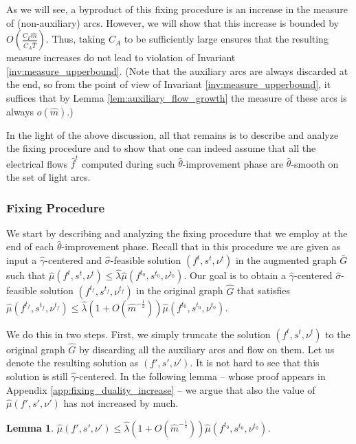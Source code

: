\documentclass[11pt, letterpaper]{article}
\newtheorem{lemma}[theorem]{Lemma}
\newcommand{\cfreeze}{C_{F}}
\newcommand{\cauxiliary}{C_{A}}
\newcommand{\oG}{\bar{G}}
\newcommand{\hG}{\widehat{G}}
\newcommand{\hm}{\widehat{m}}
\newcommand{\hT}{\widehat{T}}
\newcommand{\hmu}{\hat{\mu}}
\newcommand{\hgamma}{\hat{\gamma}}
\newcommand{\htheta}{\hat{\theta}}
\newcommand{\hlambda}{\hat{\lambda}}
\newcommand{\vnu}{\boldsymbol{\mathit{\nu}}}
\newcommand{\hvsigma}{\boldsymbol{\mathit{\hat{\sigma}}}}
\newcommand{\ff}{\boldsymbol{\mathit{f}}}
\newcommand{\hff}{\boldsymbol{\mathit{\hat{f}}}}
\renewcommand{\ss}{\boldsymbol{\mathit{s}}}
\begin{document}
As we will see, a byproduct of this fixing procedure is an increase in the measure of (non-auxiliary) arcs. However, we will show that this increase is bounded by $O(\frac{\cfreeze\hm}{\cauxiliary \hT})$. Thus, taking $\cauxiliary$ to be sufficiently large ensures that the resulting measure increases do not lead to violation of Invariant \ref{inv:measure_upperbound}. (Note that the auxiliary arcs are always discarded at the end, so from the point of view of Invariant \ref{inv:measure_upperbound}, it suffices that by Lemma \ref{lem:auxiliary_flow_growth} the measure of these arcs is always $o(\hm)$.)

In the light of the above discussion, all that remains is to describe and analyze the fixing procedure and to show that one can indeed assume that all the electrical flows $\hff^t$ computed during such $\htheta$-improvement phase are $\htheta$-smooth on the set of light arcs. 


\subsubsection*{Fixing Procedure}\label{sec:fixing}
We start by describing and analyzing the fixing procedure that we employ at the end of each $\htheta$-improvement phase. Recall that in this procedure we are given as input a $\hgamma$-centered and $\hvsigma$-feasible solution $(\ff^{t},\ss^{t},\vnu^{t})$ in the augmented graph $\oG$ such that
$\hmu(\ff^{t},\ss^{t},\vnu^{t})\leq \hlambda \hmu(\ff^{t_0},\ss^{t_0},\vnu^{t_0})$. Our goal is to obtain 
a $\hgamma$-centered $\hvsigma$-feasible solution $(\ff^{t_f},\ss^{t_f},\vnu^{t_f})$ in the original graph $\hG$ that satisfies $\hmu(\ff^{t_f},\ss^{t_f},\vnu^{t_f})\leq \hlambda (1+O(\hm^{-\frac{1}{2}}))\hmu(\ff^{t_0},\ss^{t_0},\vnu^{t_0})$.

We do this in two steps. First, we simply truncate the solution $(\ff^{t},\ss^{t},\vnu^{t})$ to the original graph $\hG$ by discarding all the auxiliary arcs and flow on them. Let us denote the resulting solution as $(\ff',\ss',\vnu')$. It is not hard to see that this solution is still $\hgamma$-centered. In the following lemma -- whose proof appears in Appendix \ref{app:fixing_duality_increase} -- we argue that also the value of $\hmu(\ff',\ss',\vnu')$ has not increased by much. 

\begin{lemma}
\label{lem:fixing_duality_increase}
$\hmu(\ff',\ss',\vnu')\leq \hlambda (1+O(\hm^{-\frac{1}{2}}))\hmu(\ff^{t_0},\ss^{t_0},\vnu^{t_0})$.
\end{lemma}
\end{document}
